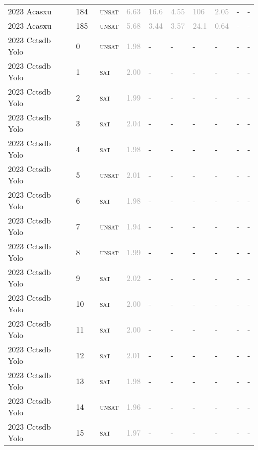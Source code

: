 \begin{center}
{\begin{longtable}{@{}llllllllll@{}}
2023 Acasxu & 184 & ~\textsc{unsat} & \textcolor{darkgray}{6.63} & \textcolor{darkgray}{16.6} & \textcolor{darkgray}{4.55} & \textcolor{darkgray}{106} & \textcolor{darkgray}{2.05} & - & - \\
2023 Acasxu & 185 & ~\textsc{unsat} & \textcolor{darkgray}{5.68} & \textcolor{darkgray}{3.44} & \textcolor{darkgray}{3.57} & \textcolor{darkgray}{24.1} & \textcolor{darkgray}{0.64} & - & - \\
\midrule
2023 Cctsdb Yolo & 0 & ~\textsc{unsat} & \textcolor{darkgray}{1.98} & - & - & - & - & - & - \\
2023 Cctsdb Yolo & 1 & ~\textsc{sat} & \textcolor{darkgray}{2.00} & - & - & - & - & - & - \\
2023 Cctsdb Yolo & 2 & ~\textsc{sat} & \textcolor{darkgray}{1.99} & - & - & - & - & - & - \\
2023 Cctsdb Yolo & 3 & ~\textsc{sat} & \textcolor{darkgray}{2.04} & - & - & - & - & - & - \\
2023 Cctsdb Yolo & 4 & ~\textsc{sat} & \textcolor{darkgray}{1.98} & - & - & - & - & - & - \\
2023 Cctsdb Yolo & 5 & ~\textsc{unsat} & \textcolor{darkgray}{2.01} & - & - & - & - & - & - \\
2023 Cctsdb Yolo & 6 & ~\textsc{sat} & \textcolor{darkgray}{1.98} & - & - & - & - & - & - \\
2023 Cctsdb Yolo & 7 & ~\textsc{unsat} & \textcolor{darkgray}{1.94} & - & - & - & - & - & - \\
2023 Cctsdb Yolo & 8 & ~\textsc{unsat} & \textcolor{darkgray}{1.99} & - & - & - & - & - & - \\
2023 Cctsdb Yolo & 9 & ~\textsc{sat} & \textcolor{darkgray}{2.02} & - & - & - & - & - & - \\
2023 Cctsdb Yolo & 10 & ~\textsc{sat} & \textcolor{darkgray}{2.00} & - & - & - & - & - & - \\
2023 Cctsdb Yolo & 11 & ~\textsc{sat} & \textcolor{darkgray}{2.00} & - & - & - & - & - & - \\
2023 Cctsdb Yolo & 12 & ~\textsc{sat} & \textcolor{darkgray}{2.01} & - & - & - & - & - & - \\
2023 Cctsdb Yolo & 13 & ~\textsc{sat} & \textcolor{darkgray}{1.98} & - & - & - & - & - & - \\
2023 Cctsdb Yolo & 14 & ~\textsc{unsat} & \textcolor{darkgray}{1.96} & - & - & - & - & - & - \\
2023 Cctsdb Yolo & 15 & ~\textsc{sat} & \textcolor{darkgray}{1.97} & - & - & - & - & - & - \\

\end{longtable}}
\end{center}
